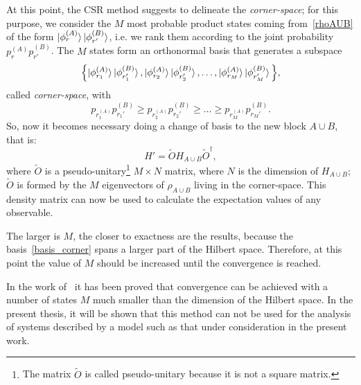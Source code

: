 At this point, the CSR method suggests to delineate the \emph{corner-space}; for this purpose, we consider the $M$ most probable product states coming from~\ref{rhoAUB} of the form $\ket{\phi_{r}^{(A)}}\ket{\phi_{r'}^{(B)}}$, i.e. we rank them according to the joint probability $p_r^{(A)}p_{r'}^{(B)}$. The $M$ states form an orthonormal basis that generates a subspace
\begin{equation}
\label{basis_corner}
    \Bigl\{\ket{\phi_{r_1}^{(A)}}\ket{\phi_{r_1'}^{(B)}}, \ket{\phi_{r_2}^{(A)}}\ket{\phi_{r_2'}^{(B)}}, \dots, \ket{\phi_{r_M}^{(A)}}\ket{\phi_{r_M'}^{(B)}} \Bigl\},
\end{equation}
called \emph{corner-space}, with
\begin{equation*}
    p_r_1^{(A)}p_{r_1'}^{(B)} \geq p_r_2^{(A)}p_{r_2'}^{(B)} \geq \dots \geq p_r_M^{(A)}p_{r_M'}^{(B)}.
\end{equation*}
So, now it becomes necessary doing a change of basis to the new block $A \cup B$, that is:
\begin{equation}
    H' = \widetilde{O} H_{A\cup B} \widetilde{O}^\dagger,
\end{equation}
where $\widetilde{O}$ is a pseudo-unitary\footnote{The matrix $\widetilde{O}$ is called pseudo-unitary because it is not a square matrix.} $M\times N$ matrix, where $N$ is the dimension of $H_{A\cup B}$; $\widetilde{O}$ is formed by the $M$ eigenvectors of $\rho_{A\cup B}$ living in the corner-space. This density matrix can now be used to calculate the expectation values of any observable.

The larger is $M$, the closer to exactness are the results, because the basis~\ref{basis_corner} spans a larger part of the Hilbert space. Therefore, at this point the value of $M$ should be increased until the convergence is reached.

In the work of~\cite{PhysRevLett.115.080604} it has been proved that convergence can be achieved with a number of states $M$ much smaller than the dimension of the Hilbert space. In the present thesis, it will be shown that this method can not be used for the analysis of systems described by a model such as that under consideration in the present work.


